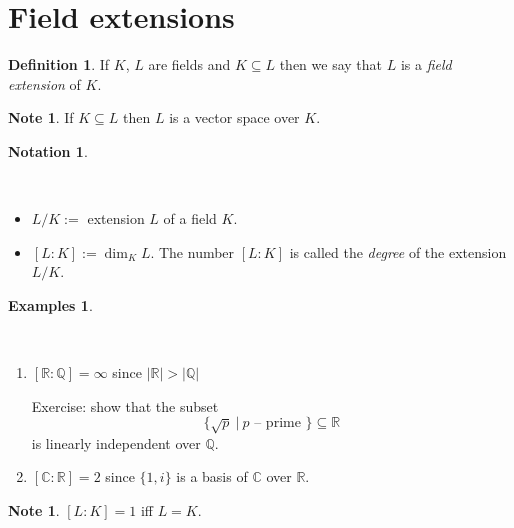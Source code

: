 \documentclass[12pt, letterpaper, oneside]{article}
\theoremstyle{plain}
\theoremstyle{definition}
\newtheorem{definition}[theorem]{Definition}
\newtheorem{examples}[theorem]{Examples}
\newtheorem{notation}[theorem]{Notation}
\newtheorem{note}[theorem]{Note}
\newcommand{\Q}{{\mathbb Q}}
\newcommand{\R}{{\mathbb R}}
\newcommand{\C}{{\mathbb C}}
\newcommand{\benu}{\begin{enumerate}}
\newcommand{\eenu}{\end{enumerate}}
\newcommand{\bit}{\begin{itemize}}
\newcommand{\eit}{\end{itemize}}
\newcommand{\vs}{\vskip 5mm}
\newcommand{\isep}[1][0]{\setlength{\itemsep}{#1 mm}}
\begin{document}


\newpage
\section{Field extensions}
\label{SEC_FIELDEXT}

\begin{definition}
If $K$, $L$ are  fields and $K\subseteq L$ then we say that $L$ is a \emph{field extension}
of $K$.
\end{definition}

\vs\vs

\begin{note}
If $K\subseteq L$ then $L$ is a vector space over $K$.
\end{note}



\vs\vs


\begin{notation}\ 

\vskip -13mm

\ 
\bit
\item $L/K :=$ extension $L$ of a field $K$.
\item $[L : K]  :=  \dim_{K}L$. The number $[L:K]$  is called the \emph{degree} of the extension 
$L/K$. 
\eit

\end{notation}


\vs\vs


\begin{examples}\ 
\vskip -13mm

\ 
\benu
\isep[5]
\item $[\R : \Q] = \infty$ since $|\R| > |\Q|$

Exercise: show that the subset 
$$\{\sqrt{p} \ | \  p \text{ -- prime } \}\subseteq \R$$
is linearly independent over $\Q$.


\item $[\C : \R] = 2$ since $\{1, i\}$ is a basis of $\C$ over $\R$.

\eenu
\end{examples}

\vs\vs

\begin{note}
$[L:K] = 1$ iff $L= K$.
\end{note}
\end{document}
